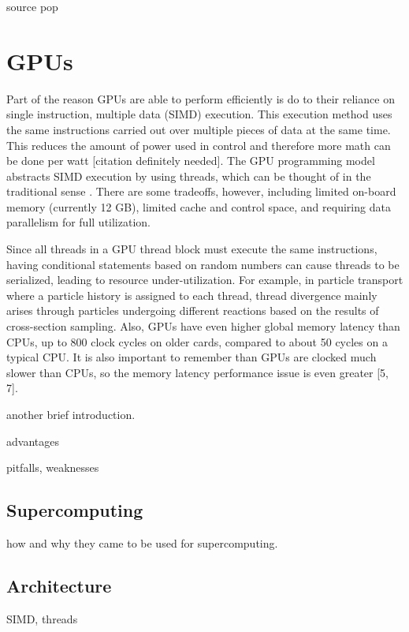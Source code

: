 source pop





\section{GPUs}

Part of the reason GPUs are able to perform efficiently is do to their reliance on single instruction, multiple data (SIMD) execution.  This execution method uses the same instructions carried out over multiple pieces of data at the same time.  This reduces the amount of power used in control and therefore more math can be done per watt [citation definitely needed].  The GPU programming model abstracts SIMD execution by using threads, which can be thought of in the traditional sense . There are some tradeoffs, however, including limited on-board memory (currently 12 GB), limited cache and control space, and requiring data parallelism for full utilization.

Since all threads in a GPU thread block must execute the same instructions, having conditional statements based on random numbers can cause threads to be serialized, leading to resource under-utilization.  For example, in particle transport where a particle history is assigned to each thread, thread divergence mainly arises through particles undergoing different reactions based on the results of cross-section sampling.  Also, GPUs have even higher global memory latency than CPUs, up to 800 clock cycles on older cards, compared to about 50 cycles on a typical CPU.  It is also important to remember than GPUs are clocked much slower than CPUs, so the memory latency performance issue is even greater [5, 7]. 

another brief introduction.  

advantages

pitfalls, weaknesses

\subsection{Supercomputing}

how and why they came to be used for supercomputing.

\subsection{Architecture}

SIMD, threads

